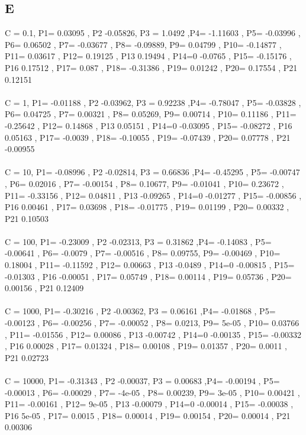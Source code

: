 \documentclass[11pt]{article} %
\begin{document}
 \subsection{E}
C = 0.1, P1= 0.03095 , P2 -0.05826, P3 = 1.0492 ,P4= -1.11603 , P5= -0.03996 , P6= 0.06502 , P7= -0.03677 , P8= -0.09889, P9= 0.04799 , P10= -0.14877 , P11= 0.03617 , P12= 0.19125 , P13 0.19494 , P14=0 -0.0765 , P15= -0.15176 , P16 0.17512 , P17= 0.087 , P18= -0.31386 , P19= 0.01242 , P20= 0.17554 , P21 0.12151\\\\ 
 C = 1, P1= -0.01188 , P2 -0.03962, P3 = 0.92238 ,P4= -0.78047 , P5= -0.03828 , P6= 0.04725 , P7= 0.00321 , P8= 0.05269, P9= 0.00714 , P10= 0.11186 , P11= -0.25642 , P12= 0.14868 , P13 0.05151 , P14=0 -0.03095 , P15= -0.08272 , P16 0.05163 , P17= -0.0039 , P18= -0.10055 , P19= -0.07439 , P20= 0.07778 , P21 -0.00955\\\\ 
 C = 10, P1= -0.08996 , P2 -0.02814, P3 = 0.66836 ,P4= -0.45295 , P5= -0.00747 , P6= 0.02016 , P7= -0.00154 , P8= 0.10677, P9= -0.01041 , P10= 0.23672 , P11= -0.33156 , P12= 0.04811 , P13 -0.09265 , P14=0 -0.01277 , P15= -0.00856 , P16 0.00461 , P17= 0.03698 , P18= -0.01775 , P19= 0.01199 , P20= 0.00332 , P21 0.10503\\\\ 
 C = 100, P1= -0.23009 , P2 -0.02313, P3 = 0.31862 ,P4= -0.14083 , P5= -0.00641 , P6= -0.0079 , P7= -0.00516 , P8= 0.09755, P9= -0.00469 , P10= 0.18004 , P11= -0.11592 , P12= 0.00663 , P13 -0.0489 , P14=0 -0.00815 , P15= -0.01303 , P16 -0.00051 , P17= 0.05749 , P18= 0.00114 , P19= 0.05736 , P20= 0.00156 , P21 0.12409 \\\\
 C = 1000, P1= -0.30216 , P2 -0.00362, P3 = 0.06161 ,P4= -0.01868 , P5= -0.00123 , P6= -0.00256 , P7= -0.00052 , P8= 0.0213, P9= 5e-05 , P10= 0.03766 , P11= -0.01556 , P12= 0.00086 , P13 -0.00742 , P14=0 -0.00135 , P15= -0.00332 , P16 0.00028 , P17= 0.01324 , P18= 0.00108 , P19= 0.01357 , P20= 0.0011 , P21 0.02723\\\\ 
 C = 10000, P1= -0.31343 , P2 -0.00037, P3 = 0.00683 ,P4= -0.00194 , P5= -0.00013 , P6= -0.00029 , P7= -4e-05 , P8= 0.00239, P9= 3e-05 , P10= 0.00421 , P11= -0.00161 , P12= 9e-05 , P13 -0.00079 , P14=0 -0.00014 , P15= -0.00038 , P16 5e-05 , P17= 0.0015 , P18= 0.00014 , P19= 0.00154 , P20= 0.00014 , P21 0.00306\\\\ 
\newpage
\end{document}

